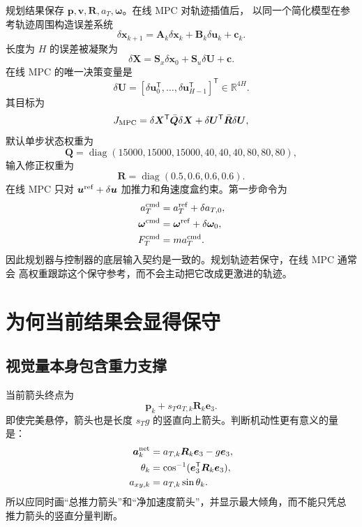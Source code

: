 \documentclass[UTF8,a4paper,11pt]{ctexart}
\newcommand{\R}{\mathbb R}
\newcommand{\diag}{\operatorname{diag}}
\begin{document}
规划结果保存 $\bm p,\bm v,\bm R,a_T,\bm\omega$。在线 MPC 对轨迹插值后，
以同一个简化模型在参考轨迹周围构造误差系统
\begin{equation}
 \delta\bm x_{k+1}=\bm A_k\delta\bm x_k+\bm B_k\delta\bm u_k+\bm c_k.
\end{equation}
长度为 $H$ 的误差被凝聚为
\begin{equation}
 \delta\bm X=\bm S_x\delta\bm x_0+\bm S_u\delta\bm U+\bm c.
\end{equation}
在线 MPC 的唯一决策变量是
\begin{equation}
 \delta\bm U=
 [\delta\bm u_0^\mathsf T,\ldots,
 \delta\bm u_{H-1}^\mathsf T]^\mathsf T\in\R^{4H}.
\end{equation}
其目标为
\begin{equation}
 J_{\rm MPC}=\delta\bm X^\mathsf T\bar{\bm Q}\delta\bm X
 +\delta\bm U^\mathsf T\bar{\bm R}\delta\bm U,
\end{equation}
默认单步状态权重为
\begin{equation}
 \bm Q=\diag(15000,15000,15000,40,40,40,80,80,80),
\end{equation}
输入修正权重为
\begin{equation}
 \bm R=\diag(0.5,0.6,0.6,0.6).
\end{equation}
在线 MPC 只对
$\bm u^{\rm ref}+\delta\bm u$ 加推力和角速度盒约束。第一步命令为
\begin{align}
 a_T^{\rm cmd}&=a_T^{\rm ref}+\delta a_{T,0},\\
 \bm\omega^{\rm cmd}&=\bm\omega^{\rm ref}+\delta\bm\omega_0,\\
 F_T^{\rm cmd}&=m a_T^{\rm cmd}.
\end{align}
因此规划器与控制器的底层输入契约是一致的。规划轨迹若保守，在线 MPC 通常会
高权重跟踪这个保守参考，而不会主动把它改成更激进的轨迹。

\section{为何当前结果会显得保守}

\subsection{视觉量本身包含重力支撑}

当前箭头终点为
\begin{equation}
 \bm p_k+s_Ta_{T,k}\bm R_k\bm e_3.
\end{equation}
即使完美悬停，箭头也是长度 $s_Tg$ 的竖直向上箭头。判断机动性更有意义的量是：
\begin{align}
 \bm a_k^{\rm net}&=a_{T,k}\bm R_k\bm e_3-g\bm e_3,\\
 \theta_k&=\cos^{-1}(\bm e_3^\mathsf T\bm R_k\bm e_3),\\
 a_{xy,k}&=a_{T,k}\sin\theta_k.
\end{align}
所以应同时画“总推力箭头”和“净加速度箭头”，并显示最大倾角，而不能只凭总
推力箭头的竖直分量判断。
\end{document}
